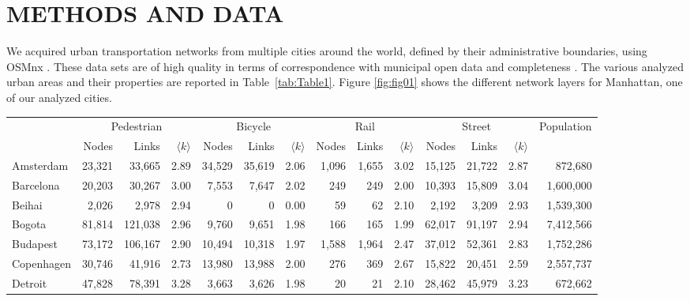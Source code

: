 \section{METHODS AND DATA}
We acquired urban transportation networks from multiple cities around the world, defined by their administrative boundaries, using OSMnx \cite{Boeing2017OSMNX}. These data sets are of high quality \cite{Haklay2010OpenStreetMap,Girres2010Quality} in terms of correspondence with municipal open data \cite{Ferster2019Bicycle} and completeness \cite{Barbosa-Filho2017Models}. The various analyzed urban areas and their properties are reported in Table~\ref{tab:Table1}. Figure \ref{fig:fig01} shows the different network layers for Manhattan, one  of our analyzed cities. 

\begin{table}[ht!]
	\centering
	\begin{adjustbox}{width=\textwidth,keepaspectratio}
		\begin{tabular}{l|rrr|rrr|rrr|rrr|r}
			{} & \multicolumn{3}{c|}{Pedestrian} & \multicolumn{3}{c|}{Bicycle} & \multicolumn{3}{c|}{Rail} & \multicolumn{3}{c|}{Street} &  Population \\
			{} &        Nodes &        Links & $\langle k \rangle$ &       Nodes &       Links & $\langle k \rangle$ &      Nodes &      Links & $\langle k \rangle$ &        Nodes &        Links & {$\langle k \rangle$} \\
			\midrule
			Amsterdam  &   23,321 &  33,665 &  2.89 &  34,529 &  35,619 &  2.06 &  1,096 &  1,655 &  3.02 &   15,125 &  21,722 &  2.87 &     872,680 \\
			Barcelona  &   20,203 &  30,267 &  3.00 &  7,553 &  7,647 &  2.02 &    249 &   249 &  2.00 &  10,393 &  15,809 &  3.04 &   1,600,000 \\
			Beihai     &    2,026 &   2,978 &  2.94 &       0 &      0 &  0.00 &    59 &    62 &  2.10 &    2,192 &   3,209 &  2.93 &   1,539,300 \\
			Bogota     &   81,814 &  121,038 &  2.96 &   9,760 &  9,651 &  1.98 &    166 &   165 &  1.99 &   62,017 &  91,197 &  2.94 &   7,412,566 \\
			Budapest   &   73,172 &  106,167 &  2.90 &  10,494 &  10,318 &  1.97 &  1,588 &  1,964 &  2.47 &   37,012 &  52,361 &  2.83 &   1,752,286 \\
			Copenhagen &   30,746 &  41,916 &  2.73 &  13,980 &  13,988 &  2.00 &   276 &   369 &  2.67 &   15,822 &  20,451 &  2.59 &   2,557,737 \\
			Detroit    &   47,828 &  78,391 &  3.28 &   3,663 &  3,626 &  1.98 &     20 &    21 &  2.10 &   28,462 &  45,979 &  3.23 &     672,662 \\

\end{tabular}
\end{adjustbox}
\end{table}
